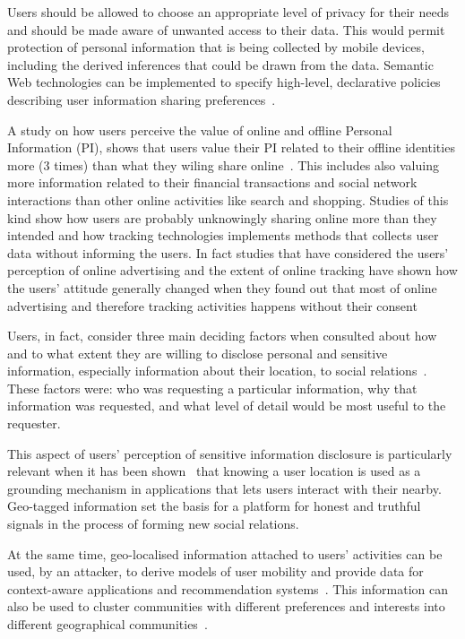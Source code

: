 Users should be allowed to choose an appropriate level of privacy for their needs and should be made aware of unwanted access to their data. This would permit protection of personal information that is being collected by mobile devices, including the derived inferences that could be drawn from the data. Semantic Web technologies can be implemented to specify high-level, declarative policies describing user information sharing preferences~\cite{jagtap2011preserving}.

A study on how users perceive the value of online and offline Personal Information (PI), shows that users value their PI related to their offline identities more (3 times) than what they wiling share online~\cite{carrascal2013your}. This includes also valuing more information related to their financial transactions and social network interactions than other online activities like search and shopping. Studies of this kind show how users are probably unknowingly sharing online more than they intended and how tracking technologies implements methods that collects user data without informing the users. In fact studies that have considered the users' perception of online advertising and the extent of online tracking have shown how the users' attitude generally changed when they found out that most of online advertising and therefore tracking activities happens without their consent~\cite{cranor2012can}

Users, in fact, consider three main deciding factors when consulted about how and to what extent they are willing to disclose personal and sensitive information, especially information about their location, to social relations~\cite{consolvo2005location}. These factors were: who was requesting a particular information, why that information was requested, and what level of detail would be most useful to the requester. 

This aspect of users' perception of sensitive information disclosure is particularly relevant when it has been shown~\cite{toch2013locality} that knowing a user location is used as a grounding mechanism in applications that lets users interact with their nearby. Geo-tagged information set the basis for a platform for honest and truthful signals in the process of forming new social relations.

At the same time, geo-localised information attached to users' activities can be used, by an attacker, to derive models of user mobility and provide data for context-aware applications and recommendation systems~\cite{melia-segui-et-al}. This information can also be used to cluster communities with different preferences and interests into different geographical communities~\cite{zhu-et-al}. 

